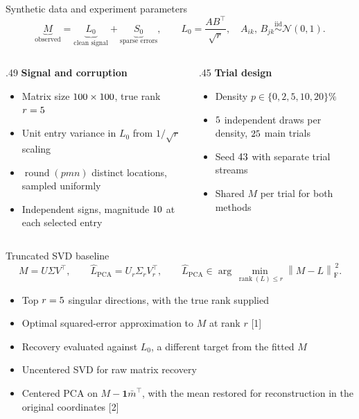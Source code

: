 \documentclass[aspectratio=1610,11pt]{beamer}
\newcommand{\frob}[1]{\left\lVert#1\right\rVert_{\mathrm F}}
\newcommand{\heading}[1]{\textcolor{accent}{\textbf{#1}}\par\smallskip}
\newcommand{\bullets}{\begin{itemize}\setlength{\itemsep}{2.6mm}}
\newcommand{\closeitems}{\end{itemize}}
\begin{document}
\begin{frame}[t]{Synthetic data and experiment parameters}
  \[
    \underbrace{M}_{\text{observed}}
    =\underbrace{L_0}_{\text{clean signal}}
    +\underbrace{S_0}_{\text{sparse errors}},
    \qquad
    L_0=\frac{AB^\top}{\sqrt r},
    \quad A_{ik},\,B_{jk}\overset{\mathrm{iid}}{\sim}\mathcal N(0,1).
  \]
  \vspace{1mm}
  \begin{columns}[T,onlytextwidth]
    \begin{column}{.49\textwidth}
      \heading{Signal and corruption}
      \bullets
        \item Matrix size \(100\times100\), true rank \(r=5\)
        \item Unit entry variance in \(L_0\) from \(1/\sqrt r\) scaling
        \item \(\operatorname{round}(pmn)\) distinct locations, sampled uniformly
        \item Independent signs, magnitude \(10\) at each selected entry
      \closeitems
    \end{column}
    \begin{column}{.45\textwidth}
      \heading{Trial design}
      \bullets
        \item Density \(p\in\{0,2,5,10,20\}\%\)
        \item \(5\) independent draws per density, \(25\) main trials
        \item Seed \(43\) with separate trial streams
        \item Shared \(M\) per trial for both methods
      \closeitems
    \end{column}
  \end{columns}
\end{frame}

\begin{frame}[t]{Truncated SVD baseline}
  \[
    M=U\Sigma V^\top,\qquad
    \hat L_{\mathrm{PCA}}=U_r\Sigma_r V_r^\top,\qquad
    \hat L_{\mathrm{PCA}}\in\arg\min_{\operatorname{rank}(L)\le r}\frob{M-L}^{\,2}.
  \]
  \vspace{3mm}
  \bullets
    \item Top \(r=5\) singular directions, with the true rank supplied
    \item Optimal squared-error approximation to \(M\) at rank \(r\) [1]
    \item Recovery evaluated against \(L_0\), a different target from the fitted \(M\)
    \item Uncentered SVD for raw matrix recovery
    \item Centered PCA on \(M-\mathbf{1}\bar m^\top\), with the mean restored
      for reconstruction in the original coordinates [2]
  \closeitems
\end{frame}
\end{document}
